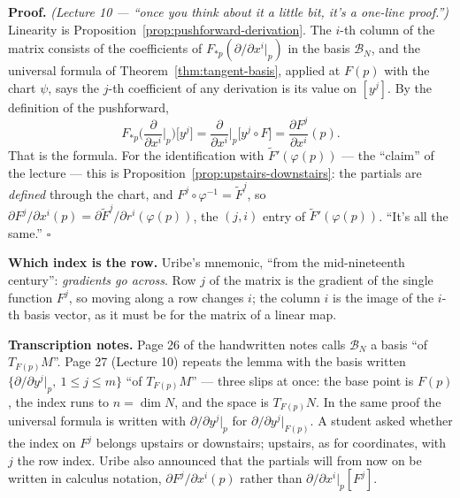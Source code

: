\documentclass[11pt]{report}
\renewenvironment{proof}[1][Proof]{\noindent\textbf{#1.} }{\hfill$\square$\par\vspace{5pt}}
\begin{document}
\begin{proof}
\textit{(Lecture 10 --- ``once you think about it a little bit, it's a one-line proof.'')} Linearity is Proposition~\ref{prop:pushforward-derivation}. The $i$-th column of the matrix consists of the coefficients of $F_{*p}(\partial/\partial x^i|_p)$ in the basis $\mathcal{B}_N$, and the universal formula of Theorem~\ref{thm:tangent-basis}, applied at $F(p)$ with the chart $\psi$, says the $j$-th coefficient of any derivation is its value on $[y^j]$. By the definition of the pushforward,
\[
F_{*p}\Big(\frac{\partial}{\partial x^i}\Big|_p\Big)\big[y^j\big] = \frac{\partial}{\partial x^i}\Big|_p\big[y^j \circ F\big] = \frac{\partial F^j}{\partial x^i}(p).
\]
That is the formula. For the identification with $\tilde F'(\varphi(p))$ --- the ``claim'' of the lecture --- this is Proposition~\ref{prop:upstairs-downstairs}: the partials are \emph{defined} through the chart, and $F^j \circ \varphi^{-1} = \tilde F^j$, so $\partial F^j/\partial x^i(p) = \partial \tilde F^j/\partial r^i(\varphi(p))$, the $(j,i)$ entry of $\tilde F'(\varphi(p))$. ``It's all the same.''
\end{proof}

\begin{rembox}\label{rem:abstract-tangent-7}
\textbf{Which index is the row.} Uribe's mnemonic, ``from the mid-nineteenth century'': \emph{gradients go across}. Row $j$ of the matrix is the gradient of the single function $F^j$, so moving along a row changes $i$; the column $i$ is the image of the $i$-th basis vector, as it must be for the matrix of a linear map.
\end{rembox}

\textbf{Transcription notes.} Page 26 of the handwritten notes calls $\mathcal{B}_N$ a basis ``of $T_{F(p)}M$''. Page 27 (Lecture 10) repeats the lemma with the basis written $\{\partial/\partial y^j|_p,\ 1 \le j \le m\}$ ``of $T_{F(p)}M$'' --- three slips at once: the base point is $F(p)$, the index runs to $n = \dim N$, and the space is $T_{F(p)}N$. In the same proof the universal formula is written with $\partial/\partial y^j|_p$ for $\partial/\partial y^j|_{F(p)}$. A student asked whether the index on $F^j$ belongs upstairs or downstairs; upstairs, as for coordinates, with $j$ the row index. Uribe also announced that the partials will from now on be written in calculus notation, $\partial F^j/\partial x^i(p)$ rather than $\partial/\partial x^i|_p[F^j]$.
\end{document}
